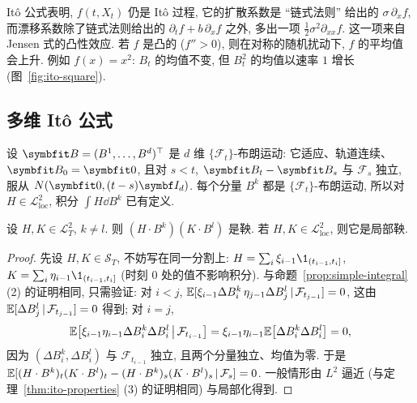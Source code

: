 \begin{intuition}
It\^o 公式表明, $f(t,X_t)$ 仍是 It\^o 过程, 它的扩散系数是 ``链式法则'' 给出的 $\sigma\,\partial_xf$, 而漂移系数除了链式法则给出的 $\partial_tf+b\,\partial_xf$ 之外, 多出一项 $\frac{1}{2}\sigma^2\partial_{xx}f$. 这一项来自 Jensen 式的凸性效应. 若 $f$ 是凸的 ($f''>0$), 则在对称的随机扰动下, $f$ 的平均值会上升. 例如 $f(x)=x^2$: $B_t$ 的均值不变, 但 $B_t^2$ 的均值以速率 $1$ 增长 (图~\ref{fig:ito-square}).
\end{intuition}

\subsection{多维 It\^o 公式}

设 $\rvec{B}=(B^1,\dots,B^d)^\T$ 是 $d$ 维 $\{\mathcal{F}_t\}$-布朗运动: 它适应、轨道连续、$\rvec{B}_0=\rvec{0}$, 且对 $s<t$, $\rvec{B}_t-\rvec{B}_s$ 与 $\mathcal{F}_s$ 独立, 服从 $N(\rvec{0},(t-s)\mat{I}_d)$. 每个分量 $B^k$ 都是 $\{\mathcal{F}_t\}$-布朗运动, 所以对 $H\in\mathscr{L}^2_{\mathrm{loc}}$, 积分 $\int H\dd B^k$ 已有定义.

\begin{proposition}[独立分量的交互变差]\label{prop:cross-bm}
设 $H,K\in\mathscr{L}^2_T$, $k\ne l$. 则 $(H\cdot B^k)(K\cdot B^l)$ 是鞅. 若 $H,K\in\mathscr{L}^2_{\mathrm{loc}}$, 则它是局部鞅.
\end{proposition}

\begin{proof}
先设 $H,K\in\mathscr{S}_T$, 不妨写在同一分割上: $H=\sum_i\xi_{i-1}\1_{(t_{i-1},t_i]}$, $K=\sum_i\eta_{i-1}\1_{(t_{i-1},t_i]}$ (时刻 $0$ 处的值不影响积分). 与命题~\ref{prop:simple-integral} (2) 的证明相同, 只需验证: 对 $i<j$, $\mathbb{E}[\xi_{i-1}\Delta B^k_i\,\eta_{j-1}\Delta B^l_j\,|\,\mathcal{F}_{t_{j-1}}]=0$, 这由 $\mathbb{E}[\Delta B^l_j\,|\,\mathcal{F}_{t_{j-1}}]=0$ 得到; 对 $i=j$,
\[
\mathbb{E}\big[\xi_{i-1}\eta_{i-1}\Delta B^k_i\Delta B^l_i\,\big|\,\mathcal{F}_{t_{i-1}}\big]=\xi_{i-1}\eta_{i-1}\mathbb{E}\big[\Delta B^k_i\Delta B^l_i\big]=0,
\]
因为 $(\Delta B^k_i,\Delta B^l_i)$ 与 $\mathcal{F}_{t_{i-1}}$ 独立, 且两个分量独立、均值为零. 于是 $\mathbb{E}[(H\cdot B^k)_t(K\cdot B^l)_t-(H\cdot B^k)_s(K\cdot B^l)_s\,|\,\mathcal{F}_s]=0$. 一般情形由 $L^2$ 逼近 (与定理~\ref{thm:ito-properties} (3) 的证明相同) 与局部化得到.
\end{proof}

